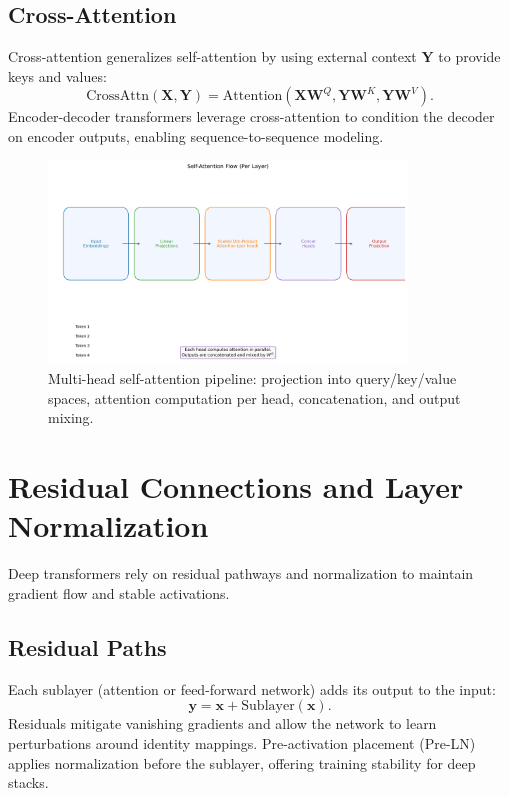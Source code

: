 \documentclass{article}
\begin{document}
\subsection{Cross-Attention}
Cross-attention generalizes self-attention by using external context $\mathbf{Y}$ to provide keys and values:
\begin{equation}
  \mathrm{CrossAttn}(\mathbf{X}, \mathbf{Y}) = \mathrm{Attention}(\mathbf{X}\mathbf{W}^Q, \mathbf{Y}\mathbf{W}^K, \mathbf{Y}\mathbf{W}^V).
\end{equation}
Encoder-decoder transformers leverage cross-attention to condition the decoder on encoder outputs, enabling sequence-to-sequence modeling.

\begin{figure}[H]
  \centering
  \includegraphics[width=0.85\textwidth]{self_attention_flow.png}
  \caption{Multi-head self-attention pipeline: projection into query/key/value spaces, attention computation per head, concatenation, and output mixing.}
  \label{fig:self_attention_flow}
\end{figure}
\FloatBarrier

\section{Residual Connections and Layer Normalization}
Deep transformers rely on residual pathways and normalization to maintain gradient flow and stable activations.

\subsection{Residual Paths}
Each sublayer (attention or feed-forward network) adds its output to the input:
\begin{equation}
  \mathbf{y} = \mathbf{x} + \mathrm{Sublayer}(\mathbf{x}).
\end{equation}
Residuals mitigate vanishing gradients and allow the network to learn perturbations around identity mappings. Pre-activation placement (Pre-LN) applies normalization before the sublayer, offering training stability for deep stacks.
\end{document}
